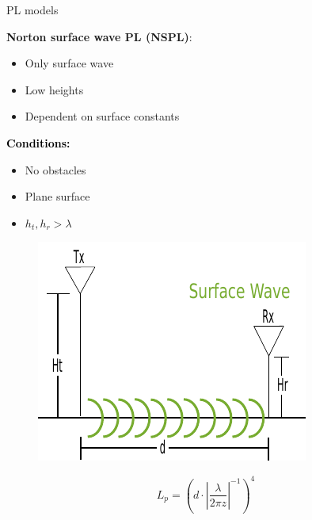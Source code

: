 \documentclass[10pt]{beamer}
\begin{document}
\begin{frame}{PL models}
\begin{minipage}{.45\textwidth}
\raggedright\textcolor{thomasgreen}{\textbf{Norton surface wave PL (NSPL)}:}
\begin{itemize}
\item Only surface wave
\item Low heights
\item Dependent on surface constants
\end{itemize}

\vspace{1em}
\textcolor{black}{\textbf{Conditions:}}
\begin{itemize}
\item No obstacles
\item Plane surface
\item $h_t,h_r > \lambda$
\end{itemize}

\end{minipage}%
\begin{minipage}{0.5\textwidth}
\begin{figure}[!htbp]
 \centering
  \includegraphics[width = \columnwidth]{figures/surf_illu.pdf}
  \end{figure}
\end{minipage}

\vspace{1em}
\begin{equation}
L_p=\left({d} \cdot \left|\frac{\lambda}{2\pi z}\right|^{-1}\right)^4
\label{surface_wave}
\end{equation}
\end{frame}
\end{document}
